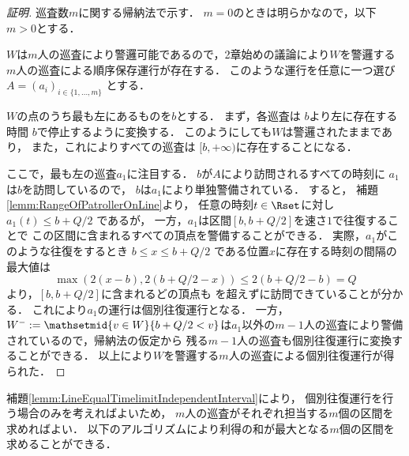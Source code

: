 \begin{proof}[証明]

    \newcommand{\leftmostpoint}{b}  %
    \newcommand{\newpatroller}{l}
    \newcommand{\leftmostpatroller}{a_1}

    巡査数$m$に関する帰納法で示す．
    $m = 0$のときは明らかなので，以下$m > 0$とする．

    $W$は$m$人の巡査により警邏可能であるので，2章始めの議論により$W$を警邏する$m$人の巡査による順序保存運行が存在する．
    このような運行を任意に一つ選び
    $A = (a _i) _{i \in \{1, \ldots, m\}}$
    とする．

    $W$の点のうち最も左にあるものを$\leftmostpoint$とする．
    まず，各巡査は
    $\leftmostpoint$より左に存在する時間
    $\leftmostpoint$で停止するように変換する．
    このようにしても$W$は警邏されたままであり，
    また，これによりすべての巡査は
    $[\leftmostpoint, +\infty)$に存在することになる．

    ここで，最も左の巡査$\leftmostpatroller$に注目する．
    $\leftmostpoint$が$A$により訪問されるすべての時刻に
    $\leftmostpatroller$は$\leftmostpoint$を訪問しているので，
    $\leftmostpoint$は$\leftmostpatroller$により単独警備されている．
    すると，
    補題\ref{lemm:RangeOfPatrollerOnLine}より，
    任意の時刻$t \in \Rset$に対し
    $\leftmostpatroller(t) \leq \leftmostpoint + Q/2$
    であるが，
    一方，$\leftmostpatroller$は区間$[b, b + Q/2]$を速さ$1$で往復することで
    この区間に含まれるすべての頂点を警備することができる．
    実際，$\leftmostpatroller$がこのような往復をするとき
    $\leftmostpoint \leq x \leq \leftmostpoint + Q/2$
    である位置$x$に存在する時刻の間隔の最大値は
    \[
        \max( 2(x - \leftmostpoint), 2(\leftmostpoint + Q/2 - x) )
        \leq 2(\leftmostpoint + Q/2 - \leftmostpoint) = Q
    \]
    より，$[\leftmostpoint, \leftmostpoint + Q/2]$に含まれるどの頂点も
    {\timelimit}を超えずに訪問できていることが分かる．
    これにより$\leftmostpatroller$の運行は個別往復運行となる．
    一方，$W^- := \mathsetmid{ v \in W }{ \leftmostpoint + Q/2 < v }$は$\leftmostpatroller$以外の$m - 1$人の巡査により警備されているので，帰納法の仮定から
    残る$m - 1$人の巡査も個別往復運行に変換することができる．
    以上により$W$を警邏する$m$人の巡査による個別往復運行が得られた．
\end{proof}


補題\ref{lemm:LineEqualTimelimitIndependentInterval}により，
個別往復運行を行う場合のみを考えればよいため，
$m$人の巡査がそれぞれ担当する$m$個の区間を求めればよい．
以下のアルゴリズムにより利得の和が最大となる$m$個の区間を求めることができる．

